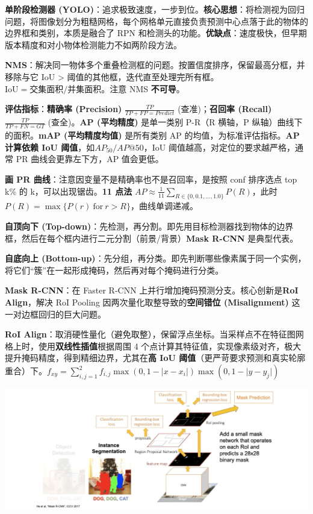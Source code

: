 \documentclass[
  8pt]{extarticle}
\begin{document}
\begin{multicols*}{4}
\textbf{单阶段检测器
(YOLO)}：追求极致速度，一步到位。\textbf{核心思想}：将检测视为回归问题，将图像划分为粗糙网格，每个网格单元直接负责预测中心点落于此的物体的边界框和类别，本质是融合了
RPN
和检测头的功能。\textbf{优缺点}：速度极快，但早期版本精度和对小物体检测能力不如两阶段方法。

\textbf{NMS}：解决同一物体多个重叠检测框的问题。按置信度排序，保留最高分框，并移除与它
IoU \textgreater{}
阈值的其他框，迭代直至处理完所有框。\(\text{IoU} = \text{交集面积} / \text{并集面积}\)。注意
NMS \textbf{不可导}。

\textbf{评估指标}：\textbf{精确率 (Precision)}
\(\frac{TP}{TP+FP=Predict}\) (查准)；\textbf{召回率 (Recall)}
\(\frac{TP}{TP+FN=GT}\) (查全)。\textbf{AP (平均精度)} 是单一类别 P-R（R
横轴，P 纵轴）曲线下的面积。\textbf{mAP (平均精度均值)} 是所有类别 AP
的均值，为标准评估指标。\textbf{AP 计算依赖 IoU
阈值}，如\(AP_{50}/AP@50\)，IoU 阈值越高，对定位的要求越严格，通常 PR
曲线会更靠左下方，AP 值会更低。

\textbf{画 PR 曲线}：注意因变量不是精确率也不是召回率，是按照 conf
排序选点 top k\% 的 k，可以出现锯齿。\textbf{11 点法}
\(AP \approx \frac{1}{11} \sum_{R \in \{0, 0.1, ..., 1.0\}} P(R)\)，此时
\(P(R) = \max\{P(r)\ \text{for}\ r > R \}\)，曲线单调递减。

\textbf{自顶向下
(Top-down)}：先检测，再分割。即先用目标检测器找到物体的边界框，然后在每个框内进行二元分割（前景/背景）\textbf{Mask
R-CNN} 是典型代表。

\textbf{自底向上
(Bottom-up)}：先分组，再分类。即先判断哪些像素属于同一个实例，将它们``簇''在一起形成掩码，然后再对每个掩码进行分类。

\textbf{Mask R-CNN}：在 Faster R-CNN
上并行增加掩码预测分支。核心创新是\textbf{RoI Align}，解决 RoI Pooling
因两次量化取整导致的\textbf{空间错位 (Misalignment)}
这一对边框回归的巨大问题。

\textbf{RoI
Align}：取消硬性量化（避免取整），保留浮点坐标。当采样点不在特征图网格上时，使用\textbf{双线性插值}根据周围
4
个点计算其特征值，实现像素级对齐，极大提升掩码精度，得到精细边界，尤其在\textbf{高
IoU
阈值}（更严苛要求预测和真实轮廓重合）下。\(f_{xy} = \sum_{i,j=1}^{2} f_{i,j} \max(0, 1 - \lvert x - x_i \rvert) \max(0, 1 - \lvert y - y_j \rvert)\)

\includegraphics{./Cheatsheet-03-Detection-and-Segmentation.assets/image-20250618013701087.png}


\end{multicols*}
\end{document}
